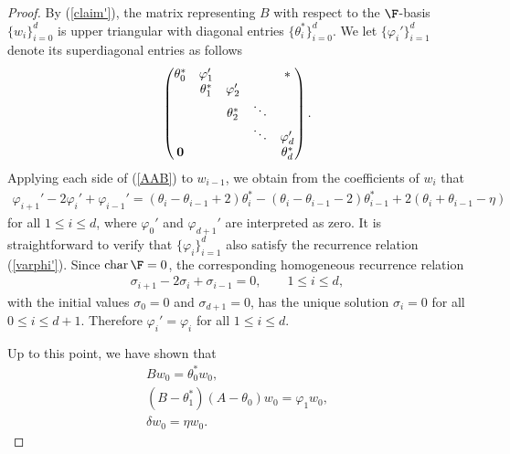 \begin{proof}
By (\ref{claim'}), the matrix representing $B$ with respect to the $\F$-basis $\{w_i\}_{i=0}^d$ is upper triangular with diagonal entries $\{\theta_i^*\}_{i=0}^d$. We let $\{\varphi_i'\}_{i=1}^d$ denote its superdiagonal entries as follows
\begin{gather}\label{B}
\begin{pmatrix}
\theta_0^* &\varphi_1' & & &{\bf *}
\\
 &\theta_1^* &\varphi_2'
\\
 & &\theta_2^* &\ddots
 \\
 & & &\ddots &\varphi_d'
 \\
{\bf 0} & & & &\theta_d^*
\end{pmatrix}.
\end{gather}
Applying each side of (\ref{AAB}) to $w_{i-1}$, we obtain from the coefficients of $w_i$ that
\begin{gather}\label{varphi'}
\varphi_{i+1}'-2\varphi_i'+\varphi_{i-1}'
=(\theta_i-\theta_{i-1}+2)\theta_i^*
-(\theta_i-\theta_{i-1}-2)\theta_{i-1}^*
+2(\theta_i+\theta_{i-1}-\eta)
\end{gather}
for all $1\leq i\leq d$, where $\varphi_0'$ and $\varphi_{d+1}'$ are interpreted as zero.
It is straightforward to verify that $\{\varphi_i\}_{i=1}^d$ also satisfy the recurrence relation (\ref{varphi'}). Since $\operatorname{char}\F=0$, the corresponding homogeneous recurrence relation
\begin{gather*}
\sigma_{i+1}-2\sigma_i+\sigma_{i-1}=0, \qquad 1\leq i\leq d,
\end{gather*}
with the initial values $\sigma_0=0$ and $\sigma_{d+1}=0$, has the unique solution $\sigma_i=0$ for all $0\leq i\leq d+1$. Therefore $\varphi_i'=\varphi_i$ for all $1\leq i\leq d$.

Up to this point, we have shown that
\begin{gather}
Bw_0=\theta_0^* w_0,\label{even:U1}\\
(B-\theta_1^*)(A-\theta_0)w_0=\varphi_1 w_0,\label{even:U2}\\
\delta w_0=\eta w_0.\label{even:U3}
\end{gather}


\end{proof}
